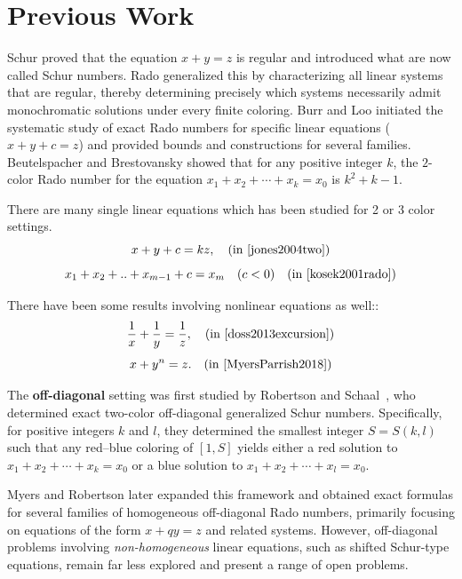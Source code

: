\documentclass[preprint,12pt]{elsarticle}
\theoremstyle{plain}
\theoremstyle{definition}
\begin{document}
\section{Previous Work}

Schur \cite{1916Schur} proved that the equation \(x+y=z\) is regular and introduced what are now called Schur numbers. Rado \cite{rado1933studien} generalized this by characterizing all linear systems that are regular, thereby determining precisely which systems necessarily admit monochromatic solutions under every finite coloring. Burr and Loo \cite{BurrLoo1975} initiated the systematic study of exact Rado numbers for specific linear equations ($x+y+c=z$) and provided bounds and constructions for several families. Beutelspacher and Brestovansky \cite{beutelspacher2006generalized} showed that for any positive integer $k$, the $2$-color Rado number for the equation
$x_1 + x_2 + \cdots + x_k = x_0$ is $k^2 + k - 1$. 

There are many single linear equations which has been studied for 2 or 3 color settings.
\[
x+y+c=kz, \quad (\text{in } \cite{jones2004two})
\]
\[
x_1+x_2+..+x_{m-1} +c= x_m \quad ( c < 0)\quad (\text{in } \cite{kosek2001rado})
\]

There have been some results involving nonlinear
equations as well::
\[
\frac{1}{x} + \frac{1}{y} = \frac{1}{z}, \quad (\text{in } \cite{doss2013excursion})
\]
\[
x + y^{n} = z. \quad (\text{in } \cite{MyersParrish2018})
\]

The \textbf{off-diagonal} setting was first studied by Robertson and Schaal~\cite{robertson_schaal2001}, who determined exact two-color off-diagonal generalized Schur numbers. Specifically, for positive integers \(k\) and \(l\), they determined the smallest integer \(S=S(k,l)\) such that any red--blue coloring of \([1,S]\) yields either a red solution to $x_1+x_2+\cdots+x_k = x_0$ or a blue solution to $x_1+x_2+\cdots+x_l = x_0$.

Myers and Robertson \cite{myers2006two} later expanded this framework and obtained exact formulas for several families of homogeneous off-diagonal Rado numbers, primarily focusing on equations of the form \(x+qy=z\) and related systems.  However, off-diagonal problems involving \emph{non-homogeneous} linear equations, such as shifted Schur-type equations, remain far less explored and present a range of open problems.
\end{document}
